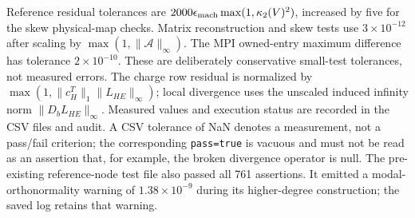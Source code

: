 \documentclass[11pt,a4paper]{article}
\begin{document}
Reference residual tolerances are
\(2000\epsilon_{\rm mach}\max(1,\kappa_2(V)^2)\), increased by five for the
skew physical-map checks. Matrix reconstruction and skew tests use
\(3\times10^{-12}\) after scaling by \(\max(1,\|\mathcal A\|_\infty)\).
The MPI owned-entry maximum difference has tolerance \(2\times10^{-10}\).
These are deliberately conservative small-test tolerances, not measured
errors. The charge row residual is normalized by
\(\max(1,\|c_H^T\|_1\|L_{HE}\|_\infty)\); local divergence uses the
unscaled induced infinity norm \(\|D_bL_{HE}\|_\infty\).
Measured values and execution status are recorded in the CSV files and audit.
A CSV tolerance of NaN denotes a measurement, not a pass/fail criterion;
the corresponding \texttt{pass=true} is vacuous and must not be read as
an assertion that, for example, the broken divergence operator is null.
The pre-existing reference-node test file also passed all 761 assertions.
It emitted a modal-orthonormality warning of \(1.38\times10^{-9}\) during
its higher-degree construction; the saved log retains that warning.

\end{document}

